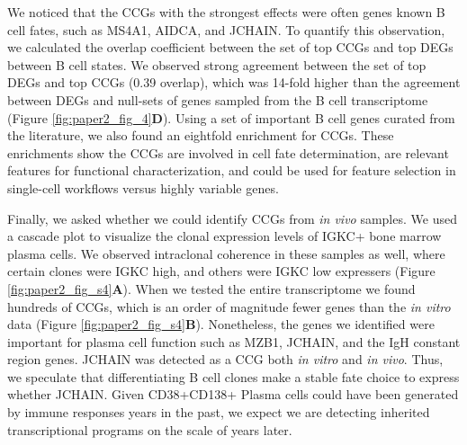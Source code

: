 We noticed that the CCGs with the strongest effects were often genes known B cell fates, such as MS4A1, AIDCA, and JCHAIN. To quantify this observation, we calculated the overlap coefficient between the set of top CCGs and top DEGs between B cell states. We observed strong agreement between the set of top DEGs and top CCGs (0.39 overlap), which was 14-fold higher than the agreement between DEGs and null-sets of genes sampled from the B cell transcriptome (Figure \ref{fig:paper2_fig_4}\textbf{D}). Using a set of important B cell genes curated from the literature\cite{morgan_unraveling_2022}, we also found an eightfold enrichment for CCGs. These enrichments show the CCGs are involved in cell fate determination, are relevant features for functional characterization, and could be used for feature selection in single-cell workflows versus highly variable genes.

Finally, we asked whether we could identify CCGs from \textit{in vivo} samples. We used a cascade plot to visualize the clonal expression levels of IGKC+ bone marrow plasma cells. We observed intraclonal coherence in these samples as well, where certain clones were IGKC high, and others were IGKC low expressers (Figure \ref{fig:paper2_fig_s4}\textbf{A}). When we tested the entire transcriptome we found hundreds of CCGs, which is an order of magnitude fewer genes than the \textit{in vitro} data (Figure \ref{fig:paper2_fig_s4}\textbf{B}). Nonetheless, the genes we identified were important for plasma cell function such as MZB1, JCHAIN, and the IgH constant region genes. JCHAIN was detected as a CCG both \textit{in vitro} and \textit{in vivo}. Thus, we speculate that differentiating B cell clones make a stable fate choice to express whether JCHAIN. Given CD38+CD138+ Plasma cells could have been generated by immune responses years in the past\cite{hammarlund_plasma_2017}, we expect we are detecting inherited transcriptional programs on the scale of years later.

